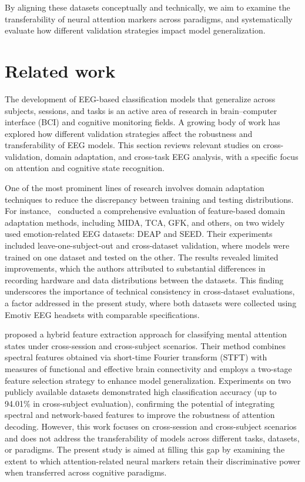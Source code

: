 \documentclass[10pt,letterpaper]{article}
\begin{document}
By aligning these datasets conceptually and technically, we aim to examine the transferability of neural attention markers across paradigms, and systematically evaluate how different validation strategies impact model generalization.

\section*{Related work}

The development of EEG-based classification models that generalize across subjects, sessions, and tasks is an active area of research in brain--computer interface (BCI) and cognitive monitoring fields. A growing body of work has explored how different validation strategies affect the robustness and transferability of EEG models. This section reviews relevant studies on cross-validation, domain adaptation, and cross-task EEG analysis, with a specific focus on attention and cognitive state recognition.

One of the most prominent lines of research involves domain adaptation techniques to reduce the discrepancy between training and testing distributions. For instance,~\cite{li2020domain} conducted a comprehensive evaluation of feature-based domain adaptation methods, including MIDA, TCA, GFK, and others, on two widely used emotion-related EEG datasets: DEAP and SEED. Their experiments included leave-one-subject-out and cross-dataset validation, where models were trained on one dataset and tested on the other. The results revealed limited improvements, which the authors attributed to substantial differences in recording hardware and data distributions between the datasets. This finding underscores the importance of technical consistency in cross-dataset evaluations, a factor addressed in the present study, where both datasets were collected using Emotiv EEG headsets with comparable specifications.

\cite{chen2025hybrid} proposed a hybrid feature extraction approach for classifying mental attention states under cross-session and cross-subject scenarios. Their method combines spectral features obtained via short-time Fourier transform (STFT) with measures of functional and effective brain connectivity and employs a two-stage feature selection strategy to enhance model generalization. Experiments on two publicly available datasets demonstrated high classification accuracy (up to 94.01\% in cross-subject evaluation), confirming the potential of integrating spectral and network-based features to improve the robustness of attention decoding. However, this work focuses on cross-session and cross-subject scenarios and does not address the transferability of models across different tasks, datasets, or paradigms. The present study is aimed at filling this gap by examining the extent to which attention-related neural markers retain their discriminative power when transferred across cognitive paradigms.
\end{document}
